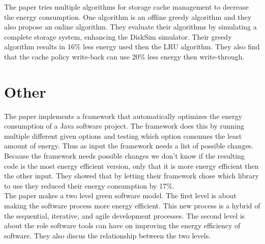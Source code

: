 The paper \cite{zhu2004reducing} tries multiple algorithms for storage cache management to decrease the energy consumption. One algorithm is an offline greedy algorithm and they also propose an online algorithm. They evaluate their algorithms by simulating a complete storage system, enhancing the DiskSim simulator. Their greedy algorithm results in 16\% less energy used then the LRU algorithm. They also find that the cache policy write-back can use 20\% less energy then write-through.\\

\section{Other}
The paper \cite{manotas2014seeds} implements a framework that automatically optimizes the energy consumption of a Java software project. The framework does this by running multiple different given options and testing which option consumes the least amount of energy. Thus as input the framework needs a list of possible changes. Because the framework needs possible changes we don't know if the resulting code is the most energy efficient version, only that it is more energy efficient then the other input. They showed that by letting their framework chose which library to use they reduced their energy consumption by 17\%.\\

The paper \cite{mahmoud2013green} makes a two level green software model. The first level is about making the software process more energy efficient. This new process is a hybrid of the sequential, iterative, and agile development processes. The second level is about the role software tools can have on improving the energy efficiency of software. They also discus the relationship between the two levels.\\




